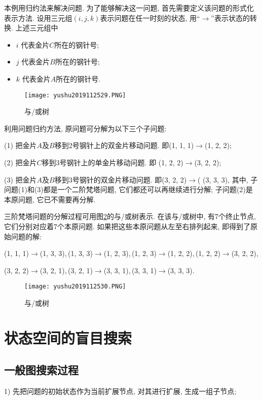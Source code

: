 \begin{answer}
本例用归约法来解决问题.
为了能够解决这一问题, 首先需要定义该问题的形式化表示方法.
设用三元组$(i, j, k)$表示问题在任一时刻的状态, 用“$\rightarrow$”表示状态的转换. 上述三元组中
\begin{itemize}
    \item $i$ 代表金片$C$所在的钢针号;
    \item $j$ 代表金片$B$所在的钢针号;
    \item $k$ 代表金片$A$所在的钢针号.
\end{itemize}
\begin{figure}[H]
    \centering
    \texttt{[image: yushu2019112529.PNG]}
    \caption{与/或树 }
    \label{AI32fig29}
\end{figure}
利用问题归约方法, 原问题可分解为以下三个子问题:

(1) 把金片$A$及$B$移到2号钢针上的双金片移动问题. 即(1, 1, 1)$\rightarrow$(1, 2, 2);

(2) 把金片$C$移到3号钢针上的单金片移动问题. 即 (1, 2, 2)$\rightarrow$(3, 2, 2);

(3) 把金片$A$及$B$移到3号钢针的双金片移动问题. 即(3, 2, 2)$\rightarrow$( (3, 3, 3), 其中, 子问题(1)和(3)都是一个二阶梵塔问题, 它们都还可以再继续进行分解; 子问题(2)是本原问题, 它已不需要再分解.

三阶梵塔问题的分解过程可用图\ref{AI32fig2019120230}的与/或树表示.
在该与/或树中, 有7个终止节点, 它们分别对应着7个本原问题. 如果把这些本原问题从左至右排列起来, 即得到了原始问题的解:

(1, 1, 1)$\rightarrow$(1, 3, 3),\,(1, 3, 3)$\rightarrow$(1, 2, 3),\,(1, 2, 3)$\rightarrow$(1, 2, 2),\,(1, 2, 2)$\rightarrow$(3, 2, 2),

(3, 2, 2)$\rightarrow$(3, 2, 1),\,(3, 2, 1)$\rightarrow$(3, 3, 1),\,(3, 3, 1)$\rightarrow$(3, 3, 3).
\begin{figure}[H]
    \centering
    \texttt{[image: yushu2019112530.PNG]}
    \caption{与/或树 }
    \label{AI32fig2019120230}
\end{figure}
\end{answer}
\section{状态空间的盲目搜索}
\subsection{一般图搜索过程}
1) 先把问题的初始状态作为当前扩展节点, 对其进行扩展, 生成一组子节点;


